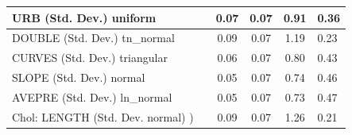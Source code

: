\begin{table}
\begin{center}
\begin{tabular}{|l|l|c|c|c|l|}
			\hline
			URB (Std. Dev.) uniform &  & 0.07 & 0.07 & 0.91 & 0.36 \\
			\hline
			DOUBLE (Std. Dev.) tn_normal &  & 0.09 & 0.07 & 1.19 & 0.23 \\
			\hline
			CURVES (Std. Dev.) triangular &  & 0.06 & 0.07 & 0.80 & 0.43 \\
			\hline
			SLOPE (Std. Dev.) normal &  & 0.05 & 0.07 & 0.74 & 0.46 \\
			\hline
			AVEPRE (Std. Dev.) ln_normal &  & 0.05 & 0.07 & 0.73 & 0.47 \\
			\hline
			 Chol: LENGTH (Std. Dev. normal) ) &  & 0.09 & 0.07 & 1.26 & 0.21 \\
			\hline
		\end{tabular}
	\end{center}
\end{table}